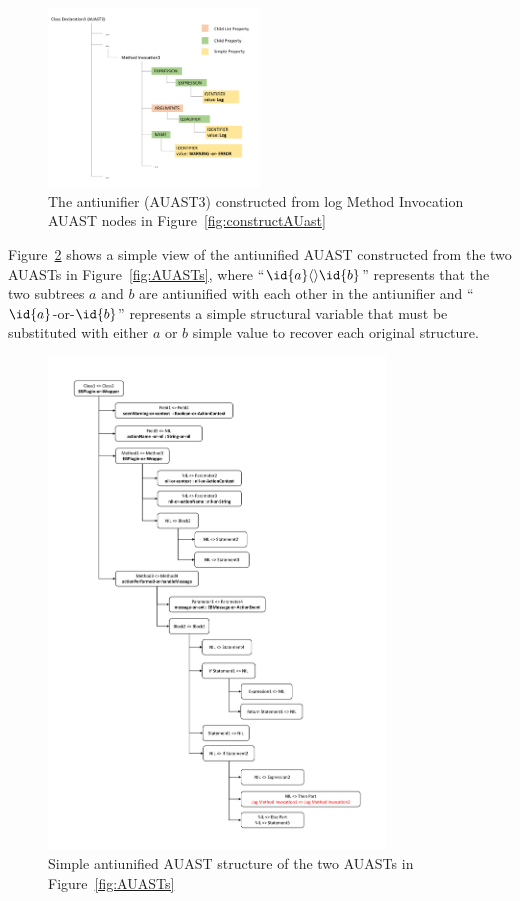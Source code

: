 \begin{figure} [H]
  \centering\includegraphics [width = 0.5\textwidth, height = 0.35\textheight]
  {Drawing4/structureAU.pdf}
  \caption{The antiunifier (AUAST3) constructed from log Method Invocation AUAST nodes in Figure~\ref{fig:constructAUast} }
  \label{fig:AUAUAST}
\end{figure}

Figure~\ref{fig:meth-antiunifier} shows a simple view of the antiunified AUAST constructed from the two AUASTs in Figure~\ref{fig:AUASTs}, where ``$\id{a}\langle\rangle\id{b}$'' represents that the two subtrees $a$ and $b$ are antiunified with each other in the antiunifier and ``$\id{a}$-or-$\id{b}$'' represents a simple structural variable that must be substituted with either $a$ or $b$ simple value to recover each original structure.


\begin{figure} [H]
  \centering\includegraphics [width = 0.8\textwidth, height = 0.9\textheight]{Drawing4/anti-unifier.pdf}
  \caption{Simple antiunified AUAST structure of the two  AUASTs in Figure~\ref{fig:AUASTs}}
  \label{fig:meth-antiunifier}
\end{figure}
